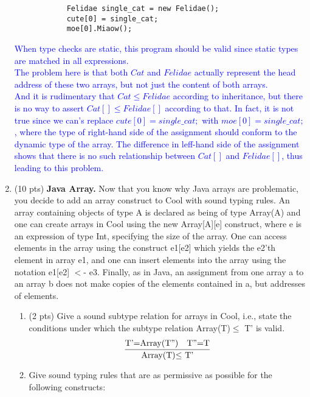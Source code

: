 \documentclass[10pt]{article}
\newcommand{\infertext}[2]{\infer{{\textrm{#1}}}{#2}}
\begin{document}
\begin{enumerate}
          \begin{verbatim}
            Felidae single_cat = new Felidae();
            cute[0] = single_cat;
            moe[0].Miaow();
        \end{verbatim}
          \textcolor{blue}{
              When type checks are static, this program should be valid since static types are matched in all expressions.\\
              The problem here is that both $Cat$ and $Felidae$ actually represent the head address of these two arrays, but not just the content of both arrays.\\
              And it is rudimentary that $Cat\leq Felidae$ according to inheritance, but there is no way to assert $Cat[]\leq Felidae[]$ according to that.
              In fact, it is not true since we can's replace $cute[0] = single\_cat;$ with $moe[0] = single\_cat;$,
              where the type of right-hand side of the assignment should conform to the dynamic type of the array.
              The difference in leff-hand side of the assignment shows that there is no such relationship between $Cat[]$ and $Felidae[]$, thus leading to this problem.
          }
          \medskip

    \item (10 pts) \textbf{Java Array.} Now that you know why Java arrays are problematic, you decide to add an array
          construct
          to Cool with sound typing rules. An array containing objects of type A is declared as being of type
          \textsf{Array(A)} and one can create arrays in Cool using the \textsf{new Array[A][e]} construct, where \textsf{e}
          is an
          expression of type \textsf{Int}, specifying the size of the array.
          One can access elements in the array using
          the construct \textsf{e1[e2]} which yields the \textsf{e2}'th element in array \textsf{e1},
          and one can insert elements into the array using the notation \textsf{e1[e2] $<$- e3}.
          Finally, as in Java, an assignment from one array \textsf{a} to an
          array \textsf{b} does not make copies of the elements contained in \textsf{a}, but addresses of elements.

          \begin{enumerate}
              \item (2 pts) Give a sound subtype relation for arrays in Cool, i.e., state the conditions under which
                    the subtype relation \textsf{Array(T)$\le$ T'} is valid.
                    \textcolor{blue}{
                        \[\infertext
                            {Array(T)$\le$ T'}
                            {\textrm{T'=Array(T'')}
                                \ \     \   \textrm{T''=T}
                            }
                        \]
                    }
              \item Give sound typing rules that are as permissive as possible for the following constructs:


\end{enumerate}
\end{enumerate}
\end{document}
